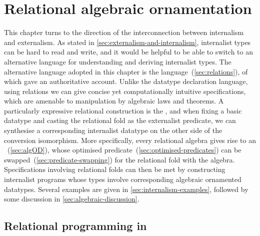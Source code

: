 \chapter{Relational algebraic ornamentation}
\label{chap:algebraic}

This chapter turns to the  direction of the interconnection between internalism and externalism.
As stated in \autoref{sec:externalism-and-internalism}, internalist types can be hard to read and write, and it would be helpful to be able to switch to an alternative language for understanding and deriving internalist types.
The alternative language adopted in this chapter is the  language~(\autoref{sec:relations}), of which \citet{Bird-AoP} gave an authoritative account.
Unlike the datatype declaration language, using relations we can give concise yet computationally intuitive specifications, which are amenable to manipulation by algebraic laws and theorems.
A particularly expressive relational construction is the , and when fixing a basic datatype and casting the relational fold as the externalist predicate, we can synthesise a corresponding internalist datatype on the other side of the conversion isomorphism.
More specifically, every relational algebra gives rise to an ~(\autoref{sec:algOD}), whose optimised predicate~(\autoref{sec:optimised-predicates}) can be swapped~(\autoref{sec:predicate-swapping}) for the relational fold with the algebra.
Specifications involving relational folds can then be met by constructing internalist programs whose types involve corresponding algebraic ornamented datatypes.
Several examples are given in \autoref{sec:internalism-examples}, followed by some discussion in \autoref{sec:algebraic-discussion}.

\section{Relational programming in \Agda}
\label{sec:relations}

